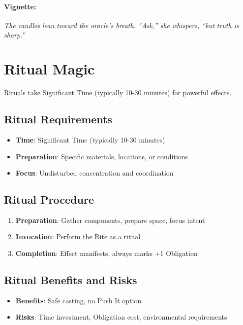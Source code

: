 \paragraph{Vignette:}
\emph{The candles lean toward the oracle's breath. ``Ask,'' she whispers, ``but truth is sharp.''}

\section{Ritual Magic} 

Rituals take Significant Time (typically 10-30 minutes) for powerful effects.

\subsection*{Ritual Requirements}
\begin{itemize}
\item \textbf{Time}: Significant Time (typically 10-30 minutes)
\item \textbf{Preparation}: Specific materials, locations, or conditions
\item \textbf{Focus}: Undisturbed concentration and coordination
\end{itemize}

\subsection*{Ritual Procedure}
\begin{enumerate}
\item \textbf{Preparation}: Gather components, prepare space, focus intent
\item \textbf{Invocation}: Perform the Rite as a ritual
\item \textbf{Completion}: Effect manifests, always marks +1 Obligation
\end{enumerate}

\subsection*{Ritual Benefits and Risks}
\begin{itemize}
\item \textbf{Benefits}: Safe casting, no Push It option
\item \textbf{Risks}: Time investment, Obligation cost, environmental requirements
\end{itemize}

